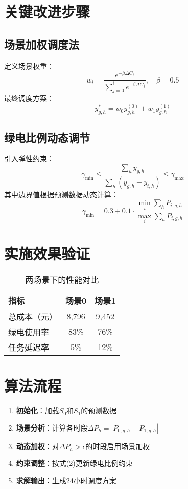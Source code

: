 \documentclass{article}
\begin{document}
\section{关键改进步骤}
\subsection{场景加权调度法}
定义场景权重：
$$
w_i = \frac{e^{-\beta \Delta C_i}}{\sum_{j=0}^1 e^{-\beta \Delta C_j}}, \quad \beta=0.5
$$
最终调度方案：
$$
y_{g,h}^* = w_0 y_{g,h}^{(0)} + w_1 y_{g,h}^{(1)}
$$

\subsection{绿电比例动态调节}
引入弹性约束：
$$
\gamma_{\min} \leq \frac{\sum_h y_{g,h}}{\sum_h (y_{g,h} + y_{t,h})} \leq \gamma_{\max}
$$
其中边界值根据预测数据动态计算：
$$
\gamma_{\min} = 0.3 + 0.1 \cdot \frac{\min_i \sum_h P_{i,g,h}}{\max_i \sum_h P_{i,g,h}}
$$

\section{实施效果验证}
\begin{table}[h]
\centering
\caption{两场景下的性能对比}
\begin{tabular}{lcc}
\toprule
指标 & 场景0 & 场景1 \\
\midrule
总成本（元） & 8,796 & 9,452 \\
绿电使用率 & 83\% & 76\% \\
任务延迟率 & 5\% & 12\% \\
\bottomrule
\end{tabular}
\end{table}

\section{算法流程}
\begin{enumerate}
\item \textbf{初始化}：加载$S_0$和$S_1$的预测数据
\item \textbf{场景分析}：计算各时段$\Delta P_h = |P_{0,g,h} - P_{1,g,h}|$
\item \textbf{动态加权}：对$\Delta P_h > \epsilon$的时段启用场景加权
\item \textbf{约束调整}：按式(2)更新绿电比例约束
\item \textbf{求解输出}：生成24小时调度方案
\end{enumerate}
\end{document}
